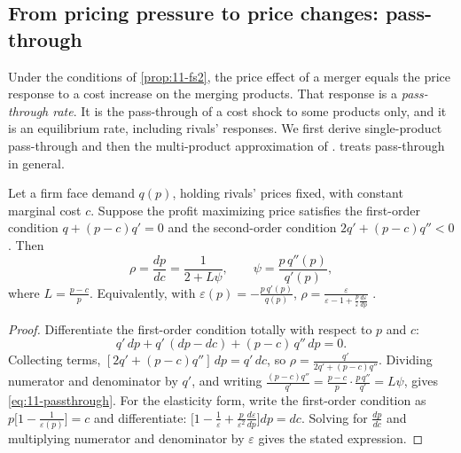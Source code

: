 \subsection{From pricing pressure to price changes: pass-through}\label{sec:11-passthrough}

Under the conditions of \cref{prop:11-fs2}, the price effect of a merger equals the price response to a cost
increase on the merging products. That response is a \emph{pass-through rate}. It is the pass-through of a cost shock to some
products only, and it is an equilibrium rate, including rivals' responses. We first derive single-product pass-through
and then the multi-product approximation of \citet{JaffeWeyl2013}.  treats pass-through in general.

\begin{lemma}\label{lem:11-passthrough}
Let a firm face demand $q(p)$, holding rivals' prices fixed, with constant marginal cost $c$. Suppose the profit
maximizing price satisfies the first-order condition $q + (p - c)q' = 0$ and the second-order condition
$2q' + (p - c)q'' < 0$. Then
\begin{equation}\label{eq:11-passthrough}
  \rho = \frac{dp}{dc} = \frac{1}{2 + L\psi} , \qquad \psi = \frac{p\,q''(p)}{q'(p)} ,
\end{equation}
where $L = \frac{p - c}{p}$. Equivalently, with $\varepsilon(p) = -\frac{p\,q'(p)}{q(p)}$,
$\rho = \frac{\varepsilon}{\varepsilon - 1 + \frac{p}{\varepsilon}\frac{d\varepsilon}{dp}}$ \citep{BulowPfleiderer1983}.
\end{lemma}

\begin{proof}
Differentiate the first-order condition totally with respect to $p$ and $c$:
\begin{equation*}
  q'\,dp + q'\,(dp - dc) + (p - c)\,q''\,dp = 0 .
\end{equation*}
Collecting terms, $[2q' + (p-c)q'']\,dp = q'\,dc$, so $\rho = \frac{q'}{2q' + (p-c)q''}$. Dividing numerator and
denominator by $q'$, and writing $\frac{(p - c)q''}{q'} = \frac{p - c}{p}\cdot\frac{p\,q''}{q'} = L\psi$, gives
\eqref{eq:11-passthrough}. For the elasticity form, write the first-order condition as
$p\big[1 - \frac{1}{\varepsilon(p)}\big] = c$ and differentiate:
$\big[1 - \frac{1}{\varepsilon} + \frac{p}{\varepsilon^2}\frac{d\varepsilon}{dp}\big]dp = dc$. Solving for
$\frac{dp}{dc}$ and multiplying numerator and denominator by $\varepsilon$ gives the stated expression.
\end{proof}

